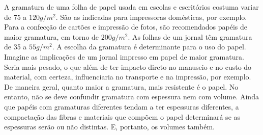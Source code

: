 \begin{knowledge}{}

A gramatura de uma folha de papel usada em escolas e escritórios costuma variar de 75 a \(120g/m^2\).  São as indicadas para impressoras domésticas, por exemplo. Para a confecção de cartões e impressão de fotos, são recomendados papéis de maior gramatura, em torno de \(200g/m^2\).  As folhas de um jornal têm gramatura de 35 a \(55g/m^2\).  A escolha da gramatura é determinante para o uso do papel. Imagine as implicações de um jornal impresso em papel de maior gramatura. Seria mais pesado, o que além de ter impacto direto no manuseio e no custo do material, com certeza, influenciaria no transporte e na impressão, por exemplo. De maneira geral, quanto maior a gramatura, mais resistente é o papel. No entanto, não se deve confundir gramatura com espessura nem com volume. Ainda que papéis com gramaturas diferentes tendam a ter espessuras diferentes, a compactação das fibras e materiais que compõem o papel determinará se as espessuras serão ou não distintas. E, portanto, os volumes também.
\end{knowledge}

